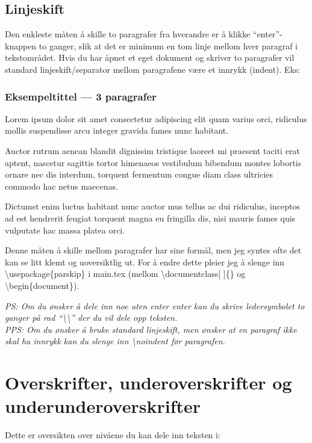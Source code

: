     \subsection{Linjeskift}
        Den enkleste måten å skille to paragrafer fra hverandre er å klikke ``enter''-knappen to ganger, slik at det er minimum en tom linje mellom hver paragraf i tekstområdet. 
        Hvis du har åpnet et eget dokument og skriver to paragrafer vil standard linjeskift/separator mellom paragrafene være et innrykk (indent). Eks:
        {
            \setlength{\parindent}{2em} %
            \parskip=0pt %
            
            \subsubsection*{Eksempeltittel --- 3 paragrafer}
            Lorem ipsum dolor sit amet consectetur adipiscing elit quam varius orci, ridiculus mollis suspendisse arcu integer gravida fames nunc habitant. 
            
            Auctor rutrum aenean blandit dignissim tristique laoreet mi praesent taciti erat aptent, nascetur sagittis tortor himenaeos vestibulum bibendum montes lobortis ornare nec dis interdum, torquent fermentum congue diam class ultricies commodo hac netus maecenas. 
            
            Dictumst enim luctus habitant nunc auctor mus tellus ac dui ridiculus, inceptos ad est hendrerit feugiat torquent magna eu fringilla dis, nisi mauris fames quis vulputate hac massa platea orci.
        }
        
        Denne måten å skille mellom paragrafer har sine formål, men jeg syntes ofte det kan se litt klemt og uoversiktlig ut. For å endre dette pleier jeg å slenge inn \textbackslash usepackage\{parskip\} i main.tex (mellom \textbackslash documentclass[ ]\{\} og \textbackslash begin\{document\}). 
        
        \textit{PS: Om du ønsker å dele inn noe uten enter enter kan du skrive ledersymbolet to ganger på rad ``\textbackslash \textbackslash'' der du vil dele opp teksten.\\
        PPS: Om du ønsker å bruke standard linjeskift, men ønsker at en paragraf ikke skal ha innrykk kan du slenge inn \textbackslash noindent før paragrafen.}
        
\section{{\Huge Overskrifter}, {underoverskrifter} og {\tiny underunderoverskrifter}}
    Dette er oversikten over nivåene du kan dele inn teksten i:
    
    

